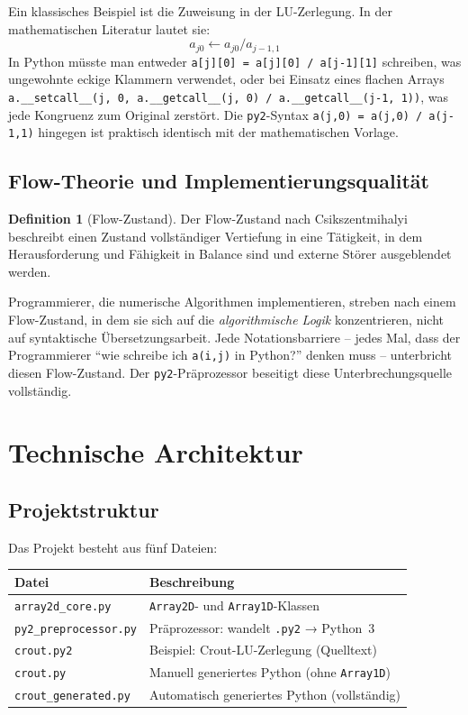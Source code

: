 \documentclass[a4paper,12pt]{article}
\theoremstyle{definition}
\newtheorem{definition}{Definition}
\begin{document}
Ein klassisches Beispiel ist die Zuweisung in der LU-Zerlegung. In der mathematischen
Literatur lautet sie:
\[
	a_{j0} \leftarrow a_{j0} / a_{j-1,1}
\]
In Python m\"usste man entweder \texttt{a[j][0] = a[j][0] / a[j-1][1]} schreiben,
was ungewohnte eckige Klammern verwendet, oder bei Einsatz eines flachen Arrays
\texttt{a.\_\_setcall\_\_(j, 0, a.\_\_getcall\_\_(j, 0) / a.\_\_getcall\_\_(j-1, 1))},
was jede Kongruenz zum Original zerst\"ort. Die \texttt{py2}-Syntax \texttt{a(j,0) = a(j,0) / a(j-1,1)}
hingegen ist praktisch identisch mit der mathematischen Vorlage.

\subsection{Flow-Theorie und Implementierungsqualit\"at}

\begin{definition}[Flow-Zustand]
	Der Flow-Zustand nach Csikszentmihalyi~\cite{csikszentmihalyi1990} beschreibt
	einen Zustand vollst\"andiger Vertiefung in eine T\"atigkeit, in dem Herausforderung
	und F\"ahigkeit in Balance sind und externe St\"orer ausgeblendet werden.
\end{definition}

Programmierer, die numerische Algorithmen implementieren, streben nach einem
Flow-Zustand, in dem sie sich auf die \emph{algorithmische Logik} konzentrieren,
nicht auf syntaktische \"Ubersetzungsarbeit. Jede Notationsbarriere -- jedes Mal,
dass der Programmierer ``wie schreibe ich \texttt{a(i,j)} in Python?'' denken muss --
unterbricht diesen Flow-Zustand. Der \texttt{py2}-Pr\"aprozessor beseitigt diese
Unterbrechungsquelle vollst\"andig.

\section{Technische Architektur}

\subsection{Projektstruktur}

Das Projekt besteht aus f\"unf Dateien:

\begin{center}
\begin{tabular}{ll}
\toprule
\textbf{Datei} & \textbf{Beschreibung} \\
\midrule
\texttt{array2d\_core.py} & \texttt{Array2D}- und \texttt{Array1D}-Klassen \\
\texttt{py2\_preprocessor.py} & Pr\"aprozessor: wandelt \texttt{.py2} → Python~3 \\
\texttt{crout.py2} & Beispiel: Crout-LU-Zerlegung (Quelltext) \\
\texttt{crout.py} & Manuell generiertes Python (ohne \texttt{Array1D}) \\
\texttt{crout\_generated.py} & Automatisch generiertes Python (vollst\"andig) \\
\bottomrule
\end{tabular}
\end{center}
\end{document}
